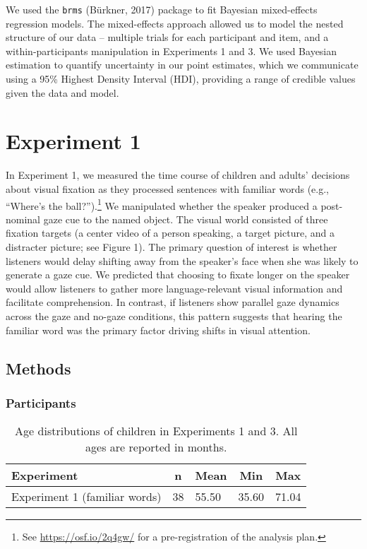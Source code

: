 \documentclass[man,floatsintext]{apa6}
\let\rmarkdownfootnote\footnote%
\def\footnote{\protect\rmarkdownfootnote}
\begin{document}
We used the \texttt{brms} (Bürkner, 2017) package to fit Bayesian
mixed-effects regression models. The mixed-effects approach allowed us
to model the nested structure of our data -- multiple trials for each
participant and item, and a within-participants manipulation in
Experiments 1 and 3. We used Bayesian estimation to quantify uncertainty
in our point estimates, which we communicate using a 95\% Highest
Density Interval (HDI), providing a range of credible values given the
data and model.

\section{Experiment 1}\label{experiment-1}

In Experiment 1, we measured the time course of children and adults'
decisions about visual fixation as they processed sentences with
familiar words (e.g., \enquote{Where's the ball?}).\footnote{See
  \url{https://osf.io/2q4gw/} for a pre-registration of the analysis
  plan.} We manipulated whether the speaker produced a post-nominal gaze
cue to the named object. The visual world consisted of three fixation
targets (a center video of a person speaking, a target picture, and a
distracter picture; see Figure 1). The primary question of interest is
whether listeners would delay shifting away from the speaker's face when
she was likely to generate a gaze cue. We predicted that choosing to
fixate longer on the speaker would allow listeners to gather more
language-relevant visual information and facilitate comprehension. In
contrast, if listeners show parallel gaze dynamics across the gaze and
no-gaze conditions, this pattern suggests that hearing the familiar word
was the primary factor driving shifts in visual attention.

\subsection{Methods}\label{methods}

\subsubsection{Participants}\label{participants}

\begin{table}[tbp]
\begin{center}
\begin{threeparttable}
\caption{\label{tab:make-ss-table}Age distributions of children in Experiments 1 and 3. All ages are reported in months.}
\begin{tabular}{lllll}
\toprule
Experiment & \multicolumn{1}{c}{n} & \multicolumn{1}{c}{Mean} & \multicolumn{1}{c}{Min} & \multicolumn{1}{c}{Max}\\
\midrule
Experiment 1 (familiar words) & 38 & 55.50 & 35.60 & 71.04\\
\bottomrule
\end{tabular}
\end{threeparttable}
\end{center}
\end{table}
\end{document}

